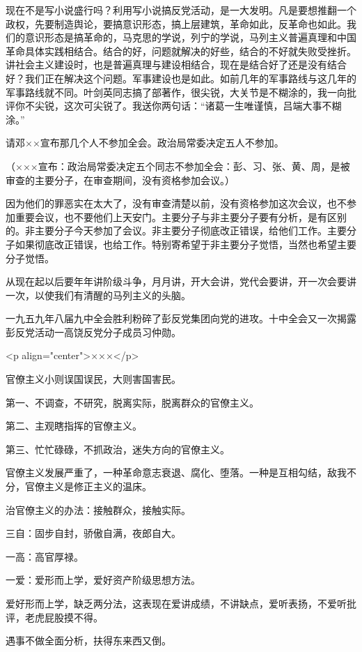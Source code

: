 现在不是写小说盛行吗？利用写小说搞反党活动，是一大发明。凡是要想推翻一个政权，先要制造舆论，要搞意识形态，搞上层建筑，革命如此，反革命也如此。我们的意识形态是搞革命的，马克思的学说，列宁的学说，马列主义普遍真理和中国革命具体实践相结合。结合的好，问题就解决的好些，结合的不好就失败受挫折。讲社会主义建设时，也是普遍真理与建设相结合，现在是结合好了还是没有结合好？我们正在解决这个问题。军事建设也是如此。如前几年的军事路线与这几年的军事路线就不同。叶剑英同志搞了部著作，很尖锐，大关节是不糊涂的，我一向批评你不尖锐，这次可尖锐了。我送你两句话：“诸葛一生唯谨慎，吕端大事不糊涂。”

请邓××宣布那几个人不参加全会。政治局常委决定五人不参加。

（×××宣布：政治局常委决定五个同志不参加全会：彭、习、张、黄、周，是被审查的主要分子，在审查期间，没有资格参加会议。）

因为他们的罪恶实在太大了，没有审查清楚以前，没有资格参加这次会议，也不参加重要会议，也不要他们上天安门。主要分子与非主要分子要有分析，是有区别的。非主要分子今天参加了会议。非主要分子彻底改正错误，给他们工作。主要分子如果彻底改正错误，也给工作。特别寄希望于非主要分子觉悟，当然也希望主要分子觉悟。

从现在起以后要年年讲阶级斗争，月月讲，开大会讲，党代会要讲，开一次会要讲一次，以使我们有清醒的马列主义的头脑。

一九五九年八届九中全会胜利粉碎了彭反党集团向党的进攻。十中全会又一次揭露彭反党活动一高饶反党分子成员习仲勋。

<p align="center">×××</p>

官僚主义小则误国误民，大则害国害民。

第一、不调查，不研究，脱离实际，脱离群众的官僚主义。

第二、主观瞎指挥的官僚主义。

第三、忙忙碌碌，不抓政治，迷失方向的官僚主义。

官僚主义发展严重了，一种革命意志衰退、腐化、堕落。一种是互相勾结，敌我不分，官僚主义是修正主义的温床。

治官僚主义的办法：接触群众，接触实际。

三自：固步自封，骄傲自满，夜郎自大。

一高：高官厚禄。

一爱：爱形而上学，爱好资产阶级思想方法。

爱好形而上学，缺乏两分法，这表现在爱讲成绩，不讲缺点，爱听表扬，不爱听批评，老虎屁股摸不得。

遇事不做全面分析，扶得东来西又倒。


